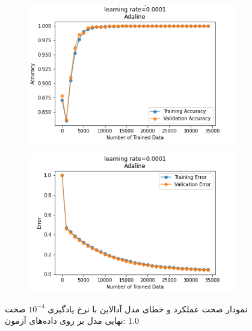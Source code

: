 \documentclass[12pt, a4paper]{article}
\begin{document}
\begin{figure}[h]
    \begin{subfigure}{0.45\linewidth}
        \centering
        \includegraphics[width=\linewidth]{images/3/adaline/lr/acc_0.0001.png}
    \end{subfigure}
    \hfil
    \begin{subfigure}{0.45\linewidth}
        \centering
        \includegraphics[width=\linewidth]{images/3/adaline/lr/error_0.0001.png}
    \end{subfigure}
    \caption{نمودار صحت عملکرد‌ و خطای مدل آدالاین با نرخ یادگیری $10^{-4}$
    \newline
    صحت نهایی مدل بر روی داده‌های آزمون: $1.0$}
\end{figure}
\clearpage
\end{document}
